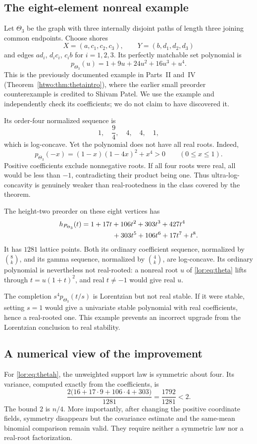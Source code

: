 \documentclass[11pt]{article}
\numberwithin{equation}{section}
\theoremstyle{definition}
\begin{document}
\subsection{The eight-element nonreal example}
Let $\Theta_3$ be the graph with three internally disjoint paths of length
three joining common endpoints. Choose shores
\[
 X=(a,c_1,c_2,c_3),\qquad Y=(b,d_1,d_2,d_3)
\]
and edges $a d_i$, $d_i c_i$, $c_i b$ for $i=1,2,3$. Its perfectly
matchable set polynomial is
\begin{equation}
 p_{\Theta_3}(u)=1+9u+24u^2+16u^3+u^4.
 \label{lor:eq:theta}
\end{equation}
This is the previously documented example in Parts~II and~IV
(Theorem~\ref{htwo:thm:thetaintro}),
where the earlier small preorder counterexample is credited to Shivam
Patel. We use the example and independently check its coefficients; we do
not claim to have discovered it.

Its order-four normalized sequence is
\[
 1,\quad\frac94,\quad4,\quad4,\quad1,
\]
which is log-concave. Yet the polynomial does not have all real roots.
Indeed,
\[
 p_{\Theta_3}(-x)=(1-x)(1-4x)^2+x^4>0\qquad(0\le x\le1).
\]
Positive coefficients exclude nonnegative roots. If all four roots were
real, all would be less than $-1$, contradicting their product being one.
Thus ultra-log-concavity is genuinely weaker than real-rootedness in the
class covered by the theorem.

The height-two preorder on these eight vertices has
\begin{align}
 h_{P_{\Theta_3}}(t)
 ={}&1+17t+106t^2+303t^3+427t^4\notag\\
    &\hspace{11mm}+303t^5+106t^6+17t^7+t^8.
 \label{lor:eq:thetah}
\end{align}
It has $1281$ lattice points. Both its ordinary coefficient sequence,
normalized by $\binom8k$, and its gamma sequence, normalized by $\binom4k$,
are log-concave. Its ordinary polynomial is nevertheless not real-rooted:
a nonreal root $u$ of \eqref{lor:eq:theta} lifts through
$t=u(1+t)^2$, and real $t\ne-1$ would give real $u$.

The completion $s^4p_{\Theta_3}(t/s)$ is Lorentzian but not real stable.
If it were stable, setting $s=1$ would give a univariate stable polynomial
with real coefficients, hence a real-rooted one. This example prevents an
incorrect upgrade from the Lorentzian conclusion to real stability.

\subsection{A numerical view of the improvement}
For \eqref{lor:eq:thetah}, the unweighted support law is symmetric about four.
Its variance, computed exactly from the coefficients, is
\[
 \frac{2\bigl(16+17\cdot9+106\cdot4+303\bigr)}{1281}
 =\frac{1792}{1281}<2.
\]
The bound $2$ is $n/4$. More importantly, after changing the positive
coordinate fields, symmetry disappears but the covariance estimate and
the same-mean binomial comparison remain valid. They require neither a
symmetric law nor a real-root factorization.
\end{document}
